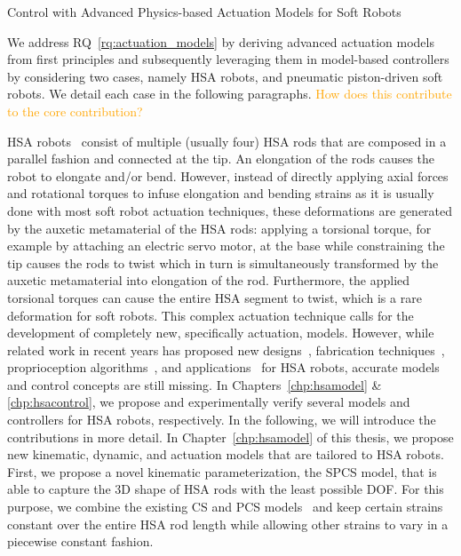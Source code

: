 \begin{contribution}\label{contrib:actuation_models}
    Control with Advanced Physics-based Actuation Models for Soft Robots
\end{contribution}
We address \gls{RQ}~\ref{rq:actuation_models} by deriving advanced actuation models from first principles and subsequently leveraging them in model-based controllers by considering two cases, namely \gls{HSA} robots, and pneumatic piston-driven soft robots. We detail each case in the following paragraphs.
\textcolor{orange}{How does this contribute to the core contribution?}

\gls{HSA} robots~\cite{lipton2018handedness, chin2018compliant} consist of multiple (usually four) \gls{HSA} rods that are composed in a parallel fashion and connected at the tip. An elongation of the rods causes the robot to elongate and/or bend. However, instead of directly applying axial forces and rotational torques to infuse elongation and bending strains as it is usually done with most soft robot actuation techniques, these deformations are generated by the auxetic metamaterial of the \gls{HSA} rods: applying a torsional torque, for example by attaching an electric servo motor, at the base while constraining the tip causes the rods to twist which in turn is simultaneously transformed by the auxetic metamaterial into elongation of the rod.
Furthermore, the applied torsional torques can cause the entire \gls{HSA} segment to twist, which is a rare deformation for soft robots.
This complex actuation technique calls for the development of completely new, specifically actuation, models. However, while related work in recent years has proposed new designs~\cite{good2022expanding, good2025torque}, fabrication techniques~\cite{truby2021recipe}, proprioception algorithms~\cite{zhang2022vision}, and applications~\cite{chen2024real} for \gls{HSA} robots, accurate models~\cite{garg2022kinematic} and control concepts are still missing. In Chapters~\ref{chp:hsamodel} \& \ref{chp:hsacontrol}, we propose and experimentally verify several models and controllers for \gls{HSA} robots, respectively. In the following, we will introduce the contributions in more detail.
In Chapter~\ref{chp:hsamodel}  of this thesis, we propose new kinematic, dynamic, and actuation models that are tailored to \gls{HSA} robots.
First, we propose a novel kinematic parameterization, the \gls{SPCS} model, that is able to capture the 3D shape of \gls{HSA} rods with the least possible \gls{DOF}.
For this purpose, we combine the existing \gls{CS} and \gls{PCS} models~\cite{renda2018discrete} and keep certain strains constant over the entire \gls{HSA} rod length while allowing other strains to vary in a piecewise constant fashion.
